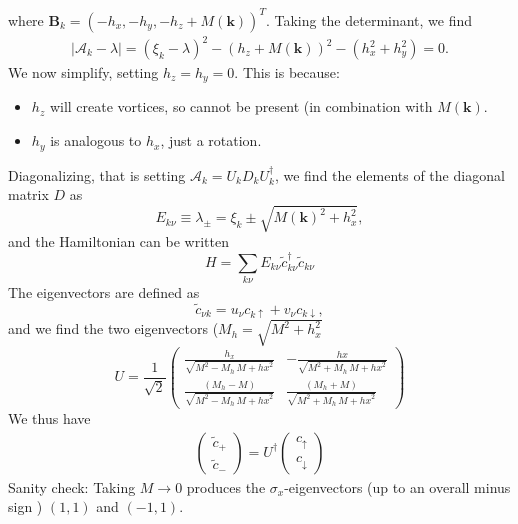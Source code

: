 \documentclass[aps,onecolumn,amsmath,amssymb,preprintnumbers,floatfix,prl,superscriptaddress,longbibliography]{revtex4-2}%
\renewcommand\vec{\mathbf}
\begin{document}
where $\vec B_k = (-h_x, -h_y, -h_z + M(\vec k))^T$.
Taking the determinant, we find
\begin{align}
    |\mathcal A_k - \lambda| = (\xi_k - \lambda)^2 - (h_z + M(\vec k))^2 - (h_x^2 + h_y^2) = 0.
\end{align}
We now simplify, setting $h_z = h_y = 0$. This is because: 
\begin{itemize}
    \item $h_z$ will create vortices, so cannot be present (in combination with $M(\vec k)$.
    \item $h_y$ is analogous to $h_x$, just a rotation.
\end{itemize}
Diagonalizing, that is setting $\mathcal A_k = U_k D_k U_k^\dagger$, we find the elements of the diagonal matrix $D$ as
\begin{equation}
    E_{k \nu }  \equiv \lambda_\pm = \xi_k \pm \sqrt{M(\vec k)^2 + h_x^2},
\end{equation}
and the Hamiltonian can be written 
\begin{equation}
    H = \sum_{k \nu} E_{k \nu} \tilde c^\dag_{k \nu} \tilde c_{k \nu}
\end{equation}
The eigenvectors are defined as
\begin{equation}
    \tilde c_{\nu k} = u_\nu c_{k \uparrow} + v_\nu c_{k \downarrow},
\end{equation}
and we find the two eigenvectors ($M_h = \sqrt{M^2 + h_x^2}$
\begin{equation}
U = \frac{1}{\sqrt{2}}
\begin{pmatrix}
\frac{h_x}{\sqrt{M^{2}-M_h\, M+\mathit{hx}^{2}}} 
& -\frac{ \mathit{hx}}{ \sqrt{M^{2}+M_h\, M+\mathit{hx}^{2}}} 
\\
 \frac{ \left(M_h-M\right)}{\sqrt{M^{2}-M_h\, M+\mathit{hx}^{2}}} 
 & \frac{ \left(M_h+M\right)}{ \sqrt{M^{2}+M_h\, M+\mathit{hx}^{2}}} 
\end{pmatrix}
\end{equation}
We thus have 
\begin{align}
\begin{pmatrix}
    \tilde c_+
    \\
    \tilde c_-
\end{pmatrix}
 = U^\dagger 
 \begin{pmatrix}
    c_\uparrow
    \\
    c_\downarrow
\end{pmatrix}
\end{align}
Sanity check: Taking $M \rightarrow 0$ produces the $\sigma_x$-eigenvectors (up to an overall minus sign ) $(1,1)$ and $(-1, 1)$.
\end{document}
